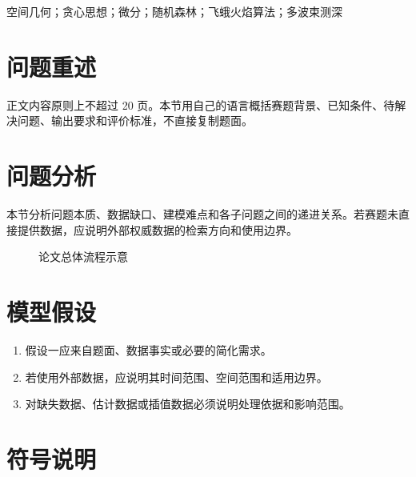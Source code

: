 \documentclass[12pt,a4paper]{article}
\newcommand{\keywordfont}{\fontsize{12pt}{16pt}\selectfont\heiti}
\newcommand{\paperstrong}[1]{{\heiti #1}}
\begin{document}
\indent {\keywordfont \paperstrong{关键词：}} \paperstrong{空间几何}；\paperstrong{贪心思想}；\paperstrong{微分}；\paperstrong{随机森林}；\paperstrong{飞蛾火焰算法}；\paperstrong{多波束测深}\label{abstract:end}


\newpage


\label{body:start}
\section{问题重述}

正文内容原则上不超过 20 页。本节用自己的语言概括赛题背景、已知条件、待解决问题、输出要求和评价标准，不直接复制题面。

\section{问题分析}

本节分析问题本质、数据缺口、建模难点和各子问题之间的递进关系。若赛题未直接提供数据，应说明外部权威数据的检索方向和使用边界。

\begin{figure}[H]
    \centering
    \caption{论文总体流程示意}
    \label{fig:flow}
\end{figure}

\section{模型假设}

\begin{enumerate}[itemsep=0.2em,topsep=0.2em]
    \item 假设一应来自题面、数据事实或必要的简化需求。
    \item 若使用外部数据，应说明其时间范围、空间范围和适用边界。
    \item 对缺失数据、估计数据或插值数据必须说明处理依据和影响范围。
\end{enumerate}

\section{符号说明}
\end{document}

